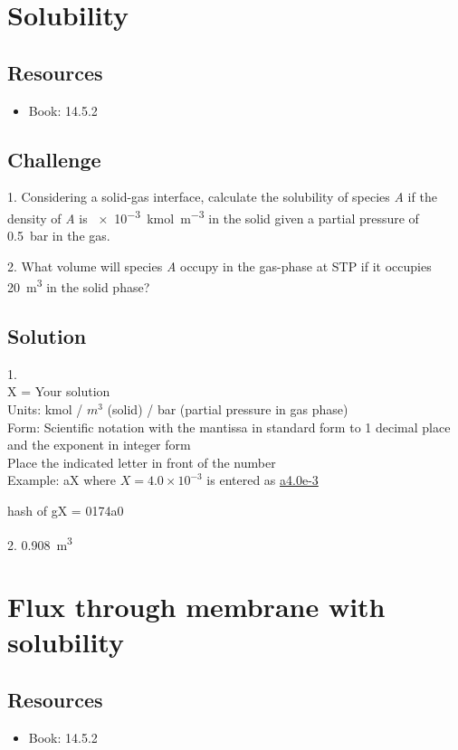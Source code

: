 \newpage
\section{Solubility}

\subsection*{Resources}
\begin{itemize}
    \item Book: 14.5.2
\end{itemize}

\subsection*{Challenge}
1. Considering a solid-gas interface, calculate the solubility of species \emph{A} if the density of \emph{A} is \SI{e-3}{\kmol\per\cubic\meter} in the solid given a partial pressure of \SI{0.5}{\bar} in the gas.

2. What volume will species \emph{A} occupy in the gas-phase at STP if it occupies \SI{20}{\cubic\meter} in the solid phase?

\subsection*{Solution}
1.\\
X = Your solution\\
Units: kmol / $m^3$ (solid) / bar (partial pressure in gas phase)\\
Form: Scientific notation with the mantissa in standard form to 1 decimal place and the exponent in integer form\\
Place the indicated letter in front of the number\\
Example: aX where $X=4.0 \times 10^{-3}$ is entered as \href{http://www.wolframalpha.com/input/?i=md5+hash+of+\%22a4.0e-3\%22}{a4.0e-3}

hash of gX = 0174a0

2. \SI{0.908}{\cubic\meter}




\newpage
\section{Flux through membrane with solubility}

\subsection*{Resources}
\begin{itemize}
    \item Book: 14.5.2
\end{itemize}

